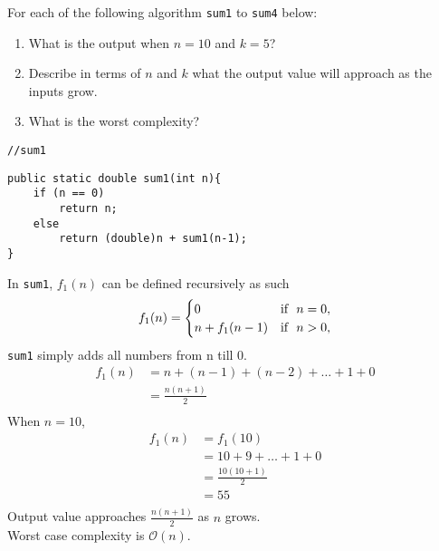 \item For each of the following algorithm \lstinline{sum1} to \lstinline{sum4} below:
\begin{enumerate}
    \item What is the output when $n=10$ and $k=5$?
    \item Describe in terms of $n$ and $k$ what the output value will approach as the inputs grow.
    \item What is the worst complexity?
\end{enumerate}

\lstinline{//sum1}
\begin{lstlisting}
public static double sum1(int n){
    if (n == 0)
        return n;
    else
        return (double)n + sum1(n-1);
}
\end{lstlisting}
In \lstinline{sum1}, $f_1(n)$ can be defined recursively as such
\begin{align*}
    f_1(n) & =
    \begin{cases}
        0\hphantom{-\sqrt{-}} & \text{if \ } n=0, \\
        n+f_1(n-1)            & \text{if \ } n>0, \\
    \end{cases} \\
\end{align*}
\lstinline{sum1} simply adds all numbers from n till 0.
\begin{align*}
    f_1(n) & =n+(n-1)+(n-2)+\ldots+1+0 \\[5pt]
           & =\frac{n(n+1)}{2}         \\
\end{align*}
When $n=10$,
\begin{align*}
    f_1(n) & =f_1(10)            \\[5pt]
           & =10+9+\ldots +1+0   \\[5pt]
           & =\frac{10(10+1)}{2} \\[5pt]
           & =55                 \\
\end{align*}
Output value approaches $\frac{n(n+1)}{2}$ as $n$ grows.\\[5pt]
Worst case complexity is $\mathcal{O}(n)$.
\clearpage


